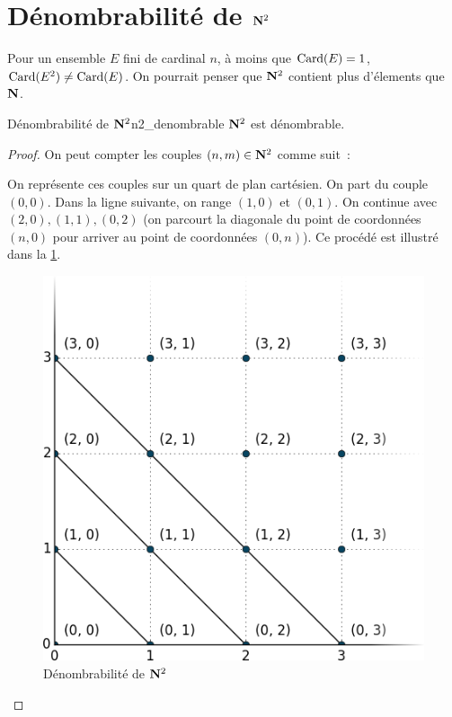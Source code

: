 \documentclass[a4paper,french,final]{memoir}
\begin{document}
\section{\texorpdfstring{Dénombrabilité de $\mathbf{N}^2$}{Dénombrabilité de N²}}
Pour un ensemble $E$ fini de cardinal $n$, à moins que $\operatorname{Card}(E) = 1$, $\operatorname{Card}(E^2) \neq \operatorname{Card}(E)$. On pourrait penser que $\mathbf{N}^2 $ contient plus d'élements que $\mathbf{N}$. 

\begin{theoremb}{Dénombrabilité de $\mathbf{N}^2$}{n2_denombrable}
	$\mathbf{N}^2$ est dénombrable. 
\end{theoremb}

\begin{proof} 
	On peut compter les couples $(n,m) \in \mathbf{N}^2$ comme suit~: \par On représente ces couples sur un quart de plan cartésien. 
	On part du couple $(0, 0)$. Dans la ligne suivante, on range $(1,0) $ et $(0,1)$. On continue avec $(2,0), (1,1), (0,2)$ (on parcourt la diagonale du point de coordonnées $(n,0)$ pour arriver au point de coordonnées $(0,n)$). Ce procédé est illustré dans la  \cref{fig:n_croix_n}.
	\begin{figure}[htb]
		\centering
		\includegraphics[scale=0.3]{n_croix_n.png}
		\caption{Dénombrabilité de $\mathbf{N}^2$}
		\label{fig:n_croix_n}
	\end{figure}
	

\end{proof}
\end{document}
